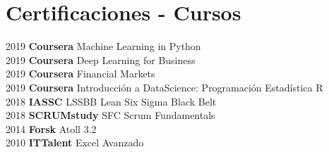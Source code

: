 \documentclass[11pt]{friggeri-cv} %
\begin{document}
\section{Certificaciones - Cursos}
2019 \hspace{0.6cm} {\textbf{Coursera} \hspace{1.3cm} Machine Learning in Python}\\
2019 \hspace{0.6cm} {\textbf{Coursera} \hspace{1.3cm} Deep Learning for Business}\\
2019 \hspace{0.6cm} {\textbf{Coursera}} \hspace{1.3cm} Financial Markets \\
2019 \hspace{0.6cm} {\textbf{Coursera}} \hspace{1.3cm} Introducción a DataScience: Programación Estadística R\\
2018 \hspace{0.6cm} {\textbf{IASSC}} \hspace{1.7cm} LSSBB Lean Six Sigma Black Belt \\
2018 \hspace{0.6cm} {\textbf{SCRUMstudy}} \hspace{0.3cm}  SFC Scrum Fundamentals\\
2014 \hspace{0.6cm} {\textbf{Forsk}} \hspace{1.95cm}  Atoll 3.2\\
2010 \hspace{0.6cm} {\textbf{ITTalent}} \hspace{1.3cm}  Excel Avanzado
\end{document}
